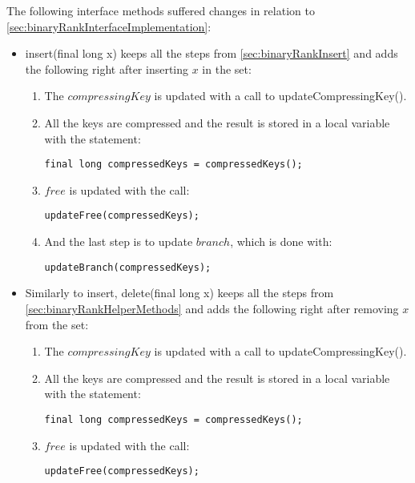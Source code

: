 The following interface methods suffered changes in relation to \ref{sec:binaryRankInterfaceImplementation}:
\begin{itemize}
    \item
    {\ttfamily insert(final long x)} keeps all the steps from \ref{sec:binaryRankInsert} and adds the following right after inserting $x$ in the set:
    \begin{enumerate}
        \item
        The $compressingKey$ is updated with a call to {\ttfamily updateCompressingKey()}.
        
        \item
        All the keys are compressed and the result is stored in a local variable with the statement:
        \begin{lstlisting}
final long compressedKeys = compressedKeys();
        \end{lstlisting}
        
        \item
        $free$ is updated with the call:
        \begin{lstlisting}
updateFree(compressedKeys);
        \end{lstlisting}
        
        \item
        And the last step is to update $branch$, which is done with:
        \begin{lstlisting}
updateBranch(compressedKeys);
        \end{lstlisting}
    \end{enumerate}
    
    \item
    Similarly to {\ttfamily insert}, {\ttfamily delete(final long x)} keeps all the steps from \ref{sec:binaryRankHelperMethods} and adds the following right after removing $x$ from the set:
    \begin{enumerate}
        \item
        The $compressingKey$ is updated with a call to {\ttfamily updateCompressingKey()}.
        
        \item
        All the keys are compressed and the result is stored in a local variable with the statement:
        \begin{lstlisting}
final long compressedKeys = compressedKeys();
        \end{lstlisting}
        
        \item
        $free$ is updated with the call:
        \begin{lstlisting}
updateFree(compressedKeys);
        \end{lstlisting}
        

\end{enumerate}
\end{itemize}
